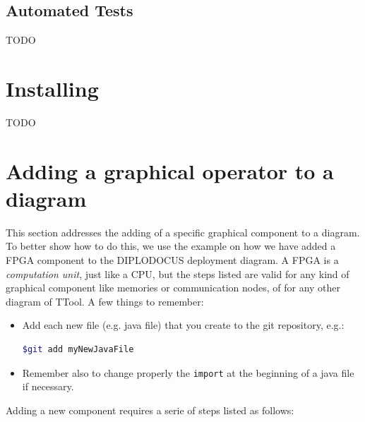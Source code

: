 \documentclass[12pt]{article}
\begin{document}
\subsection{Automated Tests}
TODO

\newpage 

\section{Installing}
TODO

\newpage

\section{Adding a graphical operator to a diagram}
This section addresses the adding of a specific graphical component to a diagram. To better show how to do this, we use the example on how we have added a FPGA component to the DIPLODOCUS deployment diagram. A FPGA is a \textit{computation unit}, just like a CPU, but the steps listed are valid for any kind of graphical component like memories or communication nodes, of for any other diagram of TTool. A few things to remember:
\begin{itemize}
\item Add each new file (e.g. java file) that you create to the git repository, e.g.:
\begin{lstlisting}[showspaces=true, language=bash, commentstyle=\color{pgreen},
keywordstyle=\color{pblue}, stringstyle=\color{pred}, basicstyle=\ttfamily]
$git add myNewJavaFile
\end{lstlisting}
\item Remember also to change properly the \texttt{import} at the beginning of a java file if necessary. 
\end{itemize}
Adding a new component requires a serie of steps listed as follows: 
\end{document}
